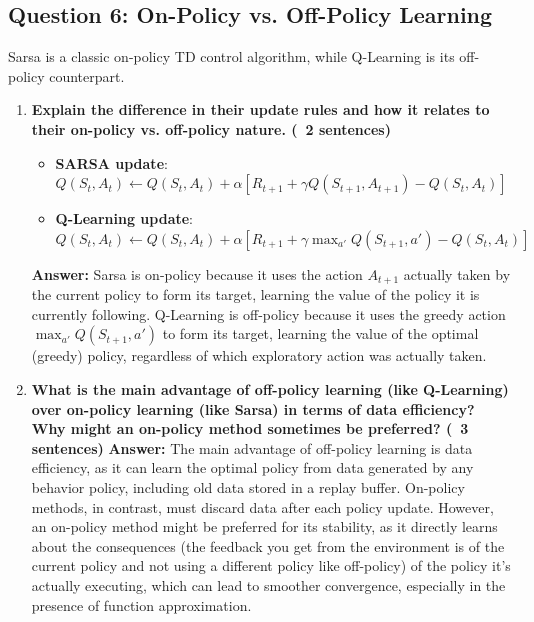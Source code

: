 \documentclass[12pt]{article}
\begin{document}
\subsection{Question 6: On-Policy vs. Off-Policy Learning}
Sarsa is a classic on-policy TD control algorithm, while Q-Learning is its off-policy counterpart.
\begin{enumerate}
    \item \textbf{Explain the difference in their update rules and how it relates to their on-policy vs. off-policy nature. (~2 sentences)}
    
    \begin{itemize}
    \item \textbf{SARSA update}: $Q(S_t, A_t) \leftarrow Q(S_t, A_t) + \alpha [R_{t+1} + \gamma Q(S_{t+1}, A_{t+1}) - Q(S_t, A_t)]$
    \item \textbf{Q-Learning update}: $Q(S_t, A_t) \leftarrow Q(S_t, A_t) + \alpha [R_{t+1} + \gamma \max_{a'} Q(S_{t+1}, a') - Q(S_t, A_t)]$
\end{itemize}

    
    \textbf{Answer:} Sarsa is on-policy because it uses the action $A_{t+1}$ actually taken by the current policy to form its target, learning the value of the policy it is currently following. Q-Learning is off-policy because it uses the greedy action $\max_{a'} Q(S_{t+1}, a')$ to form its target, learning the value of the optimal (greedy) policy, regardless of which exploratory action was actually taken.
    
    \item \textbf{What is the main advantage of off-policy learning (like Q-Learning) over on-policy learning (like Sarsa) in terms of data efficiency? Why might an on-policy method sometimes be preferred? (~3 sentences)}
    \textbf{Answer:} The main advantage of off-policy learning is data efficiency, as it can learn the optimal policy from data generated by any behavior policy, including old data stored in a replay buffer. On-policy methods, in contrast, must discard data after each policy update. However, an on-policy method might be preferred for its stability, as it directly learns about the consequences (the feedback you get from the environment is of the current policy and not using a different policy like off-policy) of the policy it's actually executing, which can lead to smoother convergence, especially in the presence of function approximation.
\end{enumerate}
\end{document}
